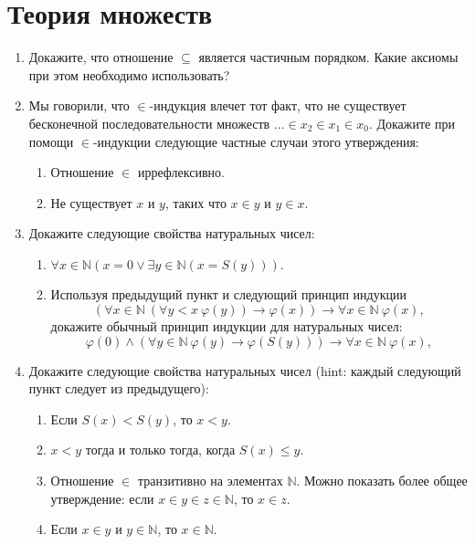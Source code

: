 \section*{Теория множеств}

\begin{enumerate}

\item Докажите, что отношение $\subseteq$ является частичным порядком. Какие аксиомы при этом необходимо 
использовать?

\item Мы говорили, что $\in$-индукция влечет тот факт, что не существует бесконечной последовательности множеств 
$\ldots \in x_2 \in x_1 \in x_0$.
    Докажите при помощи $\in$-индукции следующие частные случаи этого утверждения:
\begin{enumerate}
\item Отношение $\in$ иррефлексивно.
\item Не существует $x$ и $y$, таких что $x \in y$ и $y \in x$.
\end{enumerate}

\item Докажите следующие свойства натуральных чисел:
\begin{enumerate}
\item $\forall x \in \mathbb{N} (x = 0 \lor \exists y \in \mathbb{N} (x = S(y)))$.
\item Используя предыдущий пункт и следующий принцип индукции
\[ (\forall x \in \mathbb{N}\ (\forall y < x\ \varphi(y)) \to \varphi(x)) \to \forall x \in \mathbb{N}\ \varphi(x), 
\]
докажите обычный принцип индукции для натуральных чисел:
\[ \varphi(0) \land (\forall y \in \mathbb{N}\ \varphi(y) \to \varphi(S(y))) \to \forall x \in \mathbb{N}\ 
\varphi(x), \]
\end{enumerate}

\item Докажите следующие свойства натуральных чисел (hint: каждый следующий пункт следует из предыдущего):
\begin{enumerate}
\item Если $S(x) < S(y)$, то $x < y$.
\item $x < y$ тогда и только тогда, когда $S(x) \leq y$.
\item Отношение $\in$ транзитивно на элементах $\mathbb{N}$.
    Можно показать более общее утверждение: если $x \in y \in z \in \mathbb{N}$, то $x \in z$.
\item Если $x \in y$ и $y \in \mathbb{N}$, то $x \in \mathbb{N}$.
\end{enumerate}

\end{enumerate}

